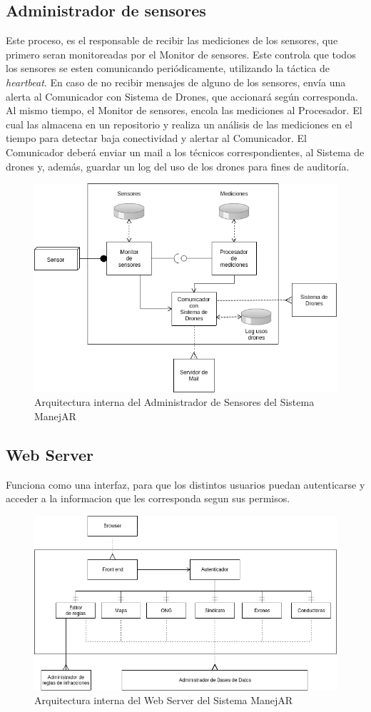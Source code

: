\subsection{Administrador de sensores}
Este proceso, es el responsable de recibir las mediciones de los sensores, que 
primero seran monitoreadas por el Monitor de sensores. Este controla que todos 
los sensores se esten comunicando periódicamente, utilizando la táctica de 
\textit{heartbeat}. En caso de no recibir mensajes de alguno de los sensores, envía una 
alerta al Comunicador con Sistema de Drones, que accionará según corresponda.
Al mismo tiempo, el Monitor de sensores, encola las mediciones al Procesador. El 
cual las almacena en un repositorio y realiza un análisis de las mediciones en 
el tiempo para detectar baja conectividad y alertar al Comunicador.
El Comunicador deberá enviar un mail a los técnicos correspondientes, al Sistema 
de drones y, además, guardar un log del uso de los drones para fines de 
auditoría.


\begin{figure}
\centerline{\includegraphics[width=1\textwidth]{./imagenes/arquitectura_tp2/administrador_sensores.png}}
\caption{Arquitectura interna del Administrador de Sensores del Sistema ManejAR}
\end{figure}


\subsection{Web Server}
Funciona como una interfaz, para que los distintos usuarios puedan autenticarse 
y acceder a la informacion que les corresponda segun sus permisos.


\begin{figure}
\centerline{\includegraphics[width=1\textwidth]{./imagenes/arquitectura_tp2/web_server.png}}
\caption{Arquitectura interna del Web Server del Sistema ManejAR}
\end{figure}
